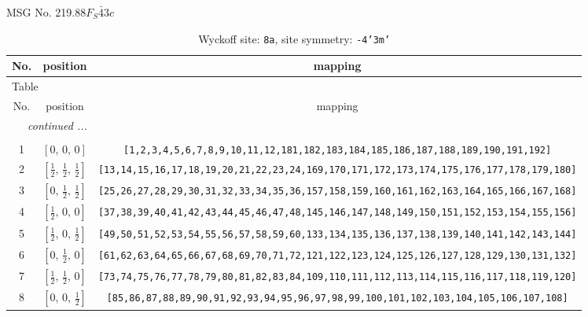 \documentclass[fleqn,8pt]{jsarticle}
\begin{document}
\setcounter{MaxMatrixCols}{32}

\renewcommand{\tablename}{Table~}
\renewcommand{\figurename}{Figure~}
\begin{center}
\LARGE
MSG No. 219.88\quad$F_{S}\bar{4}3c$
\end{center}
\renewcommand{\arraystretch}{1.2}
\begin{longtable}{ccc}
\caption{Wyckoff site: {\tt 8a}, site symmetry: {\tt -4'3m'}}
 \\
 \hline \hline
No. & position & mapping \\ \hline \endfirsthead

\multicolumn{2}{l}{\tablename\ \thetable{}} \\
 \hline \hline
No. & position & mapping \\ \hline \endhead

 \hline \hline
\multicolumn{2}{r}{\footnotesize\it continued ...} \\ \endfoot

 \hline \hline
\multicolumn{2}{r}{} \\ \endlastfoot

1 & $\left[ 0,\, 0,\, 0 \right]$ & {\tt [1,2,3,4,5,6,7,8,9,10,11,12,181,182,183,184,185,186,187,188,189,190,191,192]} \\ \hline
2 & $\left[ \frac{1}{2},\, \frac{1}{2},\, \frac{1}{2} \right]$ & {\tt [13,14,15,16,17,18,19,20,21,22,23,24,169,170,171,172,173,174,175,176,177,178,179,180]} \\ \hline
3 & $\left[ 0,\, \frac{1}{2},\, \frac{1}{2} \right]$ & {\tt [25,26,27,28,29,30,31,32,33,34,35,36,157,158,159,160,161,162,163,164,165,166,167,168]} \\ \hline
4 & $\left[ \frac{1}{2},\, 0,\, 0 \right]$ & {\tt [37,38,39,40,41,42,43,44,45,46,47,48,145,146,147,148,149,150,151,152,153,154,155,156]} \\ \hline
5 & $\left[ \frac{1}{2},\, 0,\, \frac{1}{2} \right]$ & {\tt [49,50,51,52,53,54,55,56,57,58,59,60,133,134,135,136,137,138,139,140,141,142,143,144]} \\ \hline
6 & $\left[ 0,\, \frac{1}{2},\, 0 \right]$ & {\tt [61,62,63,64,65,66,67,68,69,70,71,72,121,122,123,124,125,126,127,128,129,130,131,132]} \\ \hline
7 & $\left[ \frac{1}{2},\, \frac{1}{2},\, 0 \right]$ & {\tt [73,74,75,76,77,78,79,80,81,82,83,84,109,110,111,112,113,114,115,116,117,118,119,120]} \\ \hline
8 & $\left[ 0,\, 0,\, \frac{1}{2} \right]$ & {\tt [85,86,87,88,89,90,91,92,93,94,95,96,97,98,99,100,101,102,103,104,105,106,107,108]} \\
\end{longtable}
\end{document}
